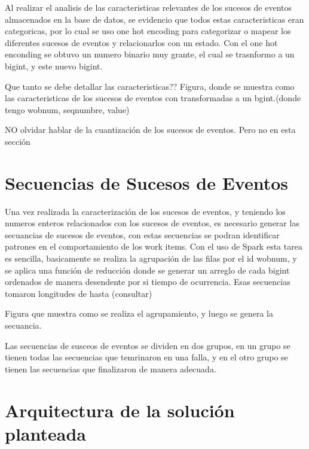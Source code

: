 Al realizar el analisis de las caracteristicas relevantes de los sucesos de eventos almacenados en la base de datos, se evidencio que todos estas caracteristicas eran categoricas, por lo cual se uso one hot encoding para categorizar o mapear los diferentes sucesos de eventos y relacionarlos con un estado. Con el one hot enconding se obtuvo un numero binario muy grante, el cual se trasnformo a un bigint, y este nuevo bigint.

Que tanto se debe detallar las caracteristicas??
Figura, donde se muestra como las caracteristicas de los sucesos de eventos con transformadas a un bgint.(donde tengo wobnum, seqnumbre, value)


NO olvidar hablar de la cuantización de los sucesos de eventos. Pero no en esta sección


\section{Secuencias de Sucesos de Eventos } %
\label{section2.2}

Una vez realizada la caracterización de los sucesos de eventos, y teniendo los numeros enteros relacionados con los sucesos de eventos, es necesario generar las secuancias de sucesos de eventos, con estas secuencias se podran identificar patrones en el comportamiento de los work items. Con el uso de Spark esta tarea es sencilla, basicamente se realiza la agrupación de las filas por el id wobnum, y se aplica una función de reducción donde se generar un arreglo de cada bigint ordenados de manera desendente por si tiempo de ocurrencia. Esas secuencias tomaron longitudes de hasta (consultar)

Figura que muestra como se realiza el agrupamiento, y luego se genera la secuancia. 


Las secuencias de susceos de eventos se dividen en dos grupos, en un grupo se tienen todas las secuencias que temrinaron en una falla, y en el otro grupo se tienen las secuencias que finalizaron de manera adecuada.




\section{Arquitectura de la solución planteada} %
\label{section2.3}

